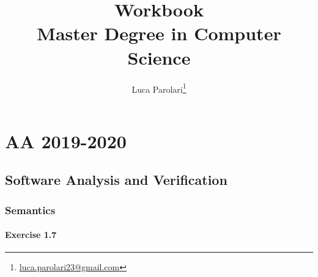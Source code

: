 \documentclass[12pt,a4paper,oneside]{book}
\title{Workbook \\ Master Degree in Computer Science}
\author{Luca Parolari\footnote{\href{mailto:luca.parolari23@gmail.com}{luca.parolari23@gmail.com}}}
\begin{document}
\maketitle
\tableofcontents

\part{AA 2019-2020}

\chapter{Software Analysis and Verification}

\section{Semantics}

\subsection{Exercise 1.7}
\end{document}
